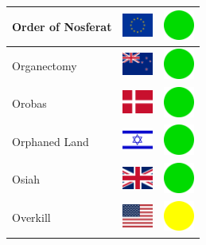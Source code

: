 \documentclass[12pt, a4paper, twoside]{report}
\begin{document}
\begin{center}
\begin{longtable}{|p{5cm}|p{2cm}|p{2cm}|}
 Order of Nosferat                                          & \includegraphics[width=1cm]{../img/flags/eu} &   \includegraphics[width=1cm]{../likes/y} \\ \hline
 Organectomy                                                & \includegraphics[width=1cm]{../img/flags/nz} &   \includegraphics[width=1cm]{../likes/y} \\ \hline
 Orobas                                                     & \includegraphics[width=1cm]{../img/flags/dk} &   \includegraphics[width=1cm]{../likes/y} \\ \hline
 Orphaned Land                                              & \includegraphics[width=1cm]{../img/flags/il} &   \includegraphics[width=1cm]{../likes/y} \\ \hline
 Osiah                                                      & \includegraphics[width=1cm]{../img/flags/gb} &   \includegraphics[width=1cm]{../likes/y} \\ \hline
 Overkill                                                   & \includegraphics[width=1cm]{../img/flags/us} &   \includegraphics[width=1cm]{../likes/m} \\ \hline

\end{longtable}
\end{center}
\end{document}
